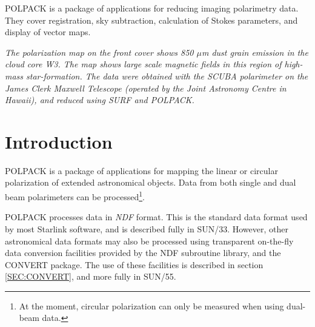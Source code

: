 \documentclass[twoside,11pt]{article}
\newcommand{\stardocinitials}  {SUN}
\newcommand{\stardocnumber}    {223.3}
\newcommand{\stardocabstract}  {POLPACK is a package of applications for 
reducing imaging polarimetry data. They cover registration, sky subtraction, 
calculation of Stokes parameters, and display of vector maps.}
\newcommand{\stardocname}{\stardocinitials /\stardocnumber}
\newcommand{\hyperref}[4]{#2\ref{#4}#3}
\newenvironment{latexonly}{}{}
\newcommand{\xref}[3]{#1}
\newcommand{\xlabel}[1]{}
\renewcommand{\_}{\texttt{\symbol{95}}}
\renewcommand{\thepage}{\roman{page}}
\begin{document}
\stardocabstract

\begin{latexonly}
\newpage
\begin{center}
\vspace*{3in}
\parbox{5in}{
{\large
\emph{The polarization map on the front cover shows 850 $\mu$m dust grain 
emission in the cloud core W3. The map shows large scale magnetic fields
in this region of high-mass star-formation. The data were obtained with
the SCUBA polarimeter on the James Clerk Maxwell Telescope  (operated by 
the Joint Astronomy Centre in Hawaii), and reduced using SURF and POLPACK.
}}}
\end{center}
\end{latexonly}

  \newpage
  \begin{latexonly}
    \setlength{\parskip}{0mm}
    \tableofcontents
    \setlength{\parskip}{\medskipamount}
    \markboth{\stardocname}{\stardocname}
  \end{latexonly}
\cleardoublepage
\renewcommand{\thepage}{\arabic{page}}
\setcounter{page}{1}

\section{\xlabel{introduction}Introduction}
POLPACK is a package of applications for mapping the linear or circular
polarization of extended astronomical objects. Data from both single and
dual beam polarimeters can be processed\footnote{At the moment, circular
polarization can only be measured when using dual-beam data.}.

POLPACK processes data in \emph{NDF} format. This is the standard data
format used by most Starlink software, and is described fully in
\xref{SUN/33}{sun33}{}. However, other astronomical data formats may also
be processed using transparent on-the-fly data conversion facilities
provided by the NDF subroutine library, and the CONVERT package. The use of 
these facilities is described \hyperref{here}{in section }{}{SEC:CONVERT},
and more fully in \xref{SUN/55}{sun55}{}.
\end{document}
